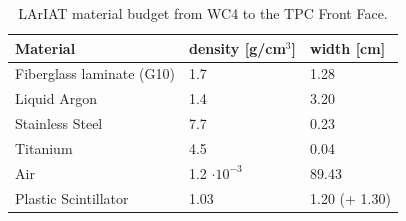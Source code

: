 \begin{table}[h!]
\centering
\begin{tabular}{|l|l|l|}
\hline
Material  & density {[}g/cm$^3${]} & width {[}cm{]}    \\ \hline
Fiberglass laminate (G10)      & 1.7                             & 1.28                              \\
Liquid Argon                           & 1.4                             & 3.20                             \\
Stainless Steel                        & 7.7                            & 0.23                             \\
Titanium                                  & 4.5                            & 0.04                             \\ 
Air                                            &  1.2 $\cdot10^{-3}$  & 89.43                              \\
Plastic Scintillator                    & 1.03                          & 1.20 (+ 1.30)                             \\ \hline
\end{tabular}
\caption{LArIAT material budget from WC4 to the TPC Front Face.}
\label{tab:budget}
\end{table}


